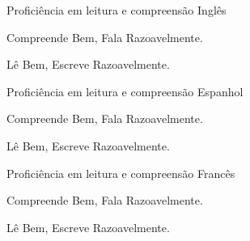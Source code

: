 \noindent
\vspace{-0.1cm}
\begin{multicols}{2}
\begin{cventries}
\noindent
\cventry
        {Proficiência em leitura e compreensão}
        {Inglês}{}{}
        {
         \begin{cvitems}
           \item {Compreende Bem, Fala Razoavelmente.}
           \item {Lê Bem, Escreve Razoavelmente.}
          \end{cvitems}
        }
\cventry
        {Proficiência em leitura e compreensão}
        {Espanhol}{}{}
        {
         \begin{cvitems}
           \item {Compreende Bem, Fala Razoavelmente.}
           \item {Lê Bem, Escreve Razoavelmente.}
          \end{cvitems}
        }
\end{cventries}
\columnbreak
\begin{cventries}
\noindent
\cventry
      {Proficiência em leitura e compreensão}
      {Francês}{}{}
      {
       \begin{cvitems}
         \item {Compreende Bem, Fala Razoavelmente.}
         \item {Lê Bem, Escreve Razoavelmente.}
        \end{cvitems}
      }
\end{cventries}
\end{multicols}

